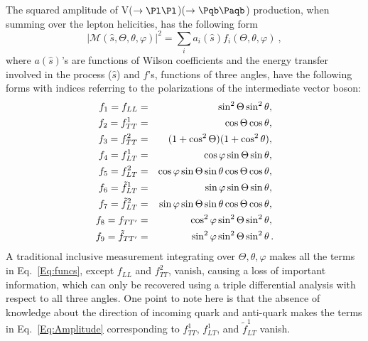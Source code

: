 \documentclass[a4paper,11pt]{article}
\newcommand{\Pb}{{{\Pqb}}\xspace}
\newcommand{\PAb}{{{{\Paqb}}}\xspace}
\renewcommand{\PV}{{{{V}}}\xspace}
\begin{document}
The squared amplitude of \PV($\to \Pl \Pl$)\PH($\to \Pb \PAb$) production, when summing over the lepton helicities, has the following form
\begin{equation}
	|\mathcal{M} \left(\hat{s}, \Theta, \theta, \varphi \right)|^{2} = {\sum}_{i} a_i \left(\hat{s}\right) f_i \left(\Theta, \theta, \varphi \right) \ ,
\label{Eq:Amplitude}
\end{equation}
where $a \left(\hat{s}\right)$'s are functions of Wilson coefficients and the energy transfer involved in the process ($\hat{s}$) and $f$'s, functions of three angles, have the following forms with indices referring to the polarizations of the intermediate vector boson:
\begin{eqnarray}
    f_{1} = f_{LL} &=& \sin^{2}\Theta \sin^{2}\theta,{\nonumber}\\
    f_{2} = f^1_{TT} &=& \cos\Theta \cos\theta,{\nonumber}\\
    f_{3} = f^2_{TT} &=& (1+\cos^{2}\Theta)(1+ \cos^{2}\theta),{\nonumber}\\
    f_{4} = f^1_{LT} &=& \cos\varphi \sin\Theta \sin\theta,{\nonumber}\\
    f_{5} = f^2_{LT} &=& \cos\varphi \sin\Theta \sin\theta \cos\Theta \cos\theta,{\nonumber}\\
    f_{6} = \tilde{f}^1_{LT} &=& \sin\varphi \sin\Theta \sin\theta, {\nonumber}\\
    f_{7} = \tilde{f}^2_{LT} &=& \sin\varphi \sin\Theta \sin\theta \cos\Theta \cos\theta,{\nonumber}\\
    f_{8} = f_{TT'} &=& \cos^{2}\varphi \sin^{2}{\Theta} \sin^{2}{\theta},{\nonumber}\\
    f_{9} = \tilde{f}_{TT'} &=&  \sin^{2}{\varphi} \sin^{2}{\Theta} \sin^{2}{\theta}\,	.
    \label{Eq:funcs}
\end{eqnarray}
A traditional inclusive measurement integrating over $\Theta, \theta, \varphi$ makes all the terms in Eq.~\eqref{Eq:funcs}, except $f_{LL}$ and $f^2_{TT}$, vanish, causing a loss of important information, which can only be recovered using a triple differential analysis with respect to all three angles.
One point to note here is that the absence of knowledge about the direction of incoming quark and anti-quark makes the terms in Eq.~\eqref{Eq:Amplitude} corresponding to $f^1_{TT}$, $f^1_{LT}$, and $\tilde{f}^1_{LT}$ vanish.
\end{document}
